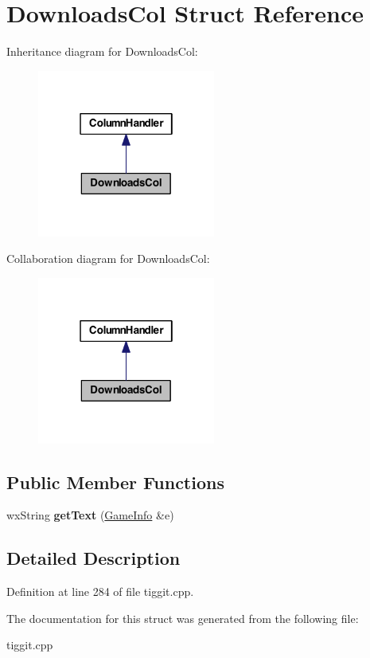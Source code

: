 \hypertarget{struct_downloads_col}{\section{Downloads\-Col Struct Reference}
\label{struct_downloads_col}
}


Inheritance diagram for Downloads\-Col\-:
\nopagebreak
\begin{figure}[H]
\begin{center}
\leavevmode
\includegraphics[width=166pt]{struct_downloads_col__inherit__graph}
\end{center}
\end{figure}


Collaboration diagram for Downloads\-Col\-:
\nopagebreak
\begin{figure}[H]
\begin{center}
\leavevmode
\includegraphics[width=166pt]{struct_downloads_col__coll__graph}
\end{center}
\end{figure}
\subsection*{Public Member Functions}
\begin{DoxyCompactItemize}
\item 
\hypertarget{struct_downloads_col_a30363fcca8ef3a4c92906e262305c9ff}{wx\-String {\bfseries get\-Text} (\hyperlink{struct_game_info}{Game\-Info} \&e)}\label{struct_downloads_col_a30363fcca8ef3a4c92906e262305c9ff}

\end{DoxyCompactItemize}


\subsection{Detailed Description}


Definition at line 284 of file tiggit.\-cpp.



The documentation for this struct was generated from the following file\-:\begin{DoxyCompactItemize}
\item 
tiggit.\-cpp\end{DoxyCompactItemize}
